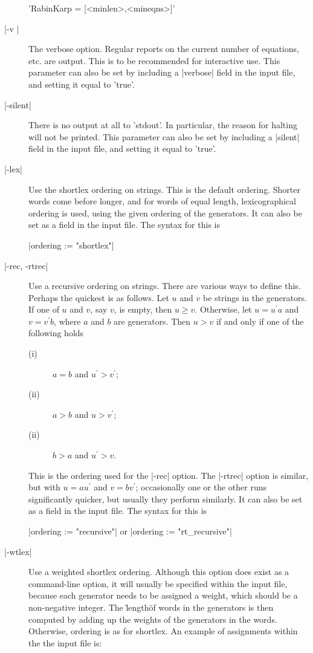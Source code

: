 \begin{description}
'RabinKarp \:= [<minlen>,<mineqns>]'
\item[|-v |]
The verbose option. Regular reports on the current number of equations, etc. are
output. This is to be recommended for interactive use.
This parameter can also be set by including a |verbose| field in the input
file, and setting it equal to 'true'.
\item[|-silent|]
There is no output at all to 'stdout'. In particular, the reason for
halting will not be printed.
This parameter can also be set by including a |silent| field in the input
file, and setting it equal to 'true'.
\item[|-lex|]
Use the shortlex ordering on strings. This is the default ordering.
Shorter words come before longer, and for words of equal length,
lexicographical ordering is used, using the given ordering of the generators.
It can also be set as a field in the input file. The syntax for this is

|ordering := "shortlex"|
\item[|-rec, -rtrec|]
Use a recursive ordering on strings. 
There are various ways to define this. Perhaps the quickest is as
follows. Let $u$ and $v$ be strings in the generators.
If one of $u$ and $v$, say $v$,  is empty, then $u \ge v$.
Otherwise, let $u=u^\prime a$ and $v=v^\prime b$,
where $a$ and $b$ are generators.
Then $u > v$ if and only if one of the following holds\:
\begin {description}
\item[(i)] $a = b$ and $u^\prime > v^\prime$;
\item[(ii)] $a > b$ and $u > v^\prime$;
\item[(ii)] $b > a$ and $u^\prime > v$.
\end {description}
This is the ordering used for the |-rec| option. The |-rtrec| option is
similar, but with $u=au^\prime$ and $v=bv^\prime$;
occasionally one or the other runs
significantly quicker, but usually they perform similarly.
It can also be set as a field in the input file. The syntax for this is

|ordering := "recursive"| \hspace{1cm} or  \hspace{1cm}
|ordering := "rt_recursive"|

\item[|-wtlex|]
Use a weighted shortlex ordering.
Although this option does exist as a command-line option, it will usually
be specified within the input file, because each generator needs to be
assigned a weight, which should be a non-negative integer. The \"length\"
of words in the generators is then computed by adding up the weights of the
generators in the words. Otherwise, ordering is as for shortlex.
An example of assignments within the the input file is:


\end{description}
